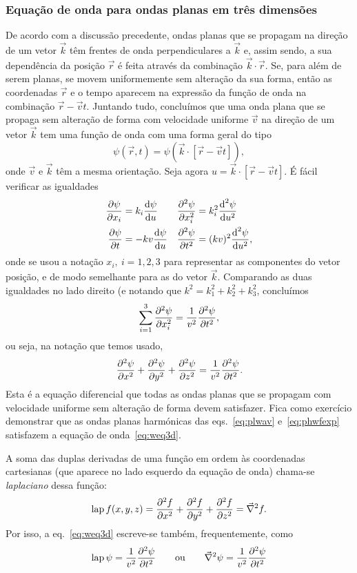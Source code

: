 \subsubsection{Equação de onda para ondas planas em três dimensões}
De acordo com a discussão precedente, ondas planas que se propagam na direção de
um vetor $\vec k$ têm frentes de onda perpendiculares a $\vec k$ e, assim sendo,
a sua dependência da posição $\vec r$ é feita através da combinação $\vec
k\cdot\vec r$. Se, para além de serem planas, se movem uniformemente sem
alteração da sua forma, então as coordenadas $\vec r$ e o tempo aparecem na
expressão da função de onda na combinação $\vec r-\vec vt$. Juntando tudo,
concluímos que uma onda plana que se propaga sem alteração de forma com
velocidade uniforme $\vec v$ na direção de um vetor $\vec k$ tem uma função de
onda com uma forma geral do tipo
\begin{equation*}
  \psi(\vec r,t)=\psi\left(\vec k\cdot[\vec r-\vec vt]\right),
\end{equation*}
onde $\vec v$ e $\vec k$ têm a mesma orientação. Seja agora $u=\vec k\cdot[\vec
r-\vec vt]$. É fácil verificar as igualdades
\begin{align*}
  \frac{\partial \psi}{\partial x_i}&=k_i\frac{\text{d} \psi}{\text{d} u}&
  \frac{\partial^2 \psi}{\partial x_i^2}&=k_i^2\frac{\text{d}^2 \psi}{\text{d} u^2}\\
  \frac{\partial \psi}{\partial t}&=-kv\frac{\text{d} \psi}{\text{d} u}&
  \frac{\partial^2 \psi}{\partial t^2}&=(kv)^2\frac{\text{d}^2 \psi}{\text{d} u^2},
\end{align*}
onde se usou a notação $x_i,\ i=1,2,3$ para representar as componentes do vetor
posição, e de modo semelhante para as do vetor $\vec k$. Comparando as duas
igualdades no lado direito (e notando que $k^2=k_1^2+k_2^2+k_3^2$, concluímos
\begin{equation*}
  \sum_{i=1}^3\frac{\partial^2 \psi}{\partial x_i^2}=\frac{1}{v^2}\frac{\partial^2 \psi}{\partial t^2},
\end{equation*}
ou seja, na notação que temos usado,
\begin{equation}\label{eq:weq3d}
  \frac{\partial^2 \psi}{\partial x^2}+\frac{\partial^2 \psi}{\partial y^2}+\frac{\partial^2 \psi}{\partial z^2}=\frac{1}{v^2}\frac{\partial^2 \psi}{\partial t^2}.
\end{equation}
Esta é a equação diferencial que todas as ondas planas que se propagam com
velocidade uniforme sem alteração de forma devem satisfazer. Fica como exercício
demonstrar que as ondas planas harmónicas das eqs.~\eqref{eq:plwav}
e~\eqref{eq:phwfexp} satisfazem a equação de onda~\eqref{eq:weq3d}.

A soma das duplas derivadas de uma função em ordem às coordenadas cartesianas
(que aparece no lado esquerdo da equação de onda) chama-se \emph{laplaciano}
dessa função:
\begin{equation*}
  \lap f(x,y,z)=\pdd{f}{x}+\pdd{f}{y}+\pdd{f}{z} = \vec\nabla^2 f.
\end{equation*}
Por isso, a eq.~\eqref{eq:weq3d} escreve-se também, frequentemente, como
\begin{equation}\label{eq:plweq3d}
  \lap \psi=\frac{1}{v^2}\pdd{\psi}{t}\qquad\text{ou}\qquad
  \vec\nabla^2\psi=
  \frac{1}{v^2}\pdd{\psi}{t}
\end{equation}



